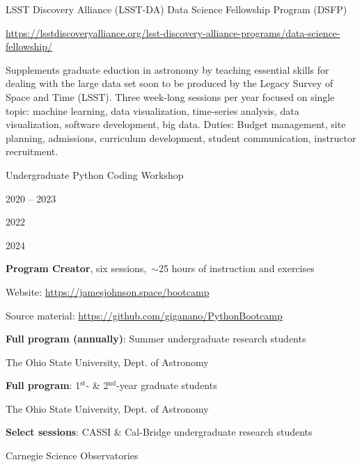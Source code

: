 \documentclass[cv.tex]{subfiles}
\begin{document}
\noindent
{\color{themecolor} \large
	LSST Discovery Alliance (LSST-DA) Data Science Fellowship Program (DSFP) \par
}
\par
\noindent
\url{https://lsstdiscoveryalliance.org/lsst-discovery-alliance-programs/data-science-fellowship/}
\par\noindent
Supplements graduate eduction in astronomy by teaching essential skills for
dealing with the large data set soon to be produced by the Legacy Survey of
Space and Time (LSST).
Three week-long sessions per year focused on single topic: machine learning,
data visualization, time-series analysis, data visualization, software
development, big data.
Duties: Budget management, site planning, admissions, curriculum development,
student communication, instructor recruitment.

\par\null\par
\noindent
{\color{themecolor} \large Undergraduate Python Coding Workshop}
\par\noindent
\parbox{0.18\textwidth}{%
	\vspace{2mm}
	\raggedleft
	\null \par
	\null \par
	\null \par
	2020 -- 2023 \par
	\null \par
	2022 \par
	\null \par
	2024 \par
	\null
}
\hspace{1mm}
\parbox{0.73\textwidth}{%
	\textbf{Program Creator}, six sessions,~$\sim$25 hours of instruction
	and exercises \par
	Website: {\small \url{https://jamesjohnson.space/bootcamp}} \par
	Source material:
	{\small \url{https://github.com/giganano/PythonBootcamp}} \par
	\textbf{Full program (annually)}: Summer undergraduate research students \par
	The Ohio State University, Dept. of Astronomy \par
	\textbf{Full program}: 1$^\text{st}$- \& 2$^\text{nd}$-year graduate
	students \par
	The Ohio State University, Dept. of Astronomy \par
	\textbf{Select sessions}: CASSI \& Cal-Bridge undergraduate research
	students \par
	Carnegie Science Observatories
}
\end{document}

